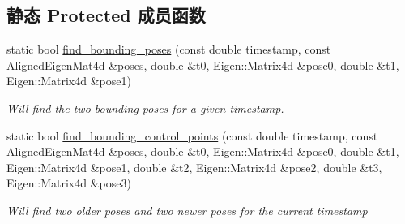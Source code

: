 \subsection*{静态 Protected 成员函数}
\begin{DoxyCompactItemize}
\item 
static bool \hyperlink{classov__core_1_1BsplineSE3_a321442ce3c2aee341c64403e047f3f36}{find\+\_\+bounding\+\_\+poses} (const double timestamp, const \hyperlink{classov__core_1_1BsplineSE3_a2e0b3cb7cef84db7b84598f2ea01e00d}{Aligned\+Eigen\+Mat4d} \&poses, double \&t0, Eigen\+::\+Matrix4d \&pose0, double \&t1, Eigen\+::\+Matrix4d \&pose1)
\begin{DoxyCompactList}\small\item\em Will find the two bounding poses for a given timestamp. \end{DoxyCompactList}\item 
static bool \hyperlink{classov__core_1_1BsplineSE3_af03bc0e8df3f77134afa0a24a425be80}{find\+\_\+bounding\+\_\+control\+\_\+points} (const double timestamp, const \hyperlink{classov__core_1_1BsplineSE3_a2e0b3cb7cef84db7b84598f2ea01e00d}{Aligned\+Eigen\+Mat4d} \&poses, double \&t0, Eigen\+::\+Matrix4d \&pose0, double \&t1, Eigen\+::\+Matrix4d \&pose1, double \&t2, Eigen\+::\+Matrix4d \&pose2, double \&t3, Eigen\+::\+Matrix4d \&pose3)
\begin{DoxyCompactList}\small\item\em Will find two older poses and two newer poses for the current timestamp \end{DoxyCompactList}\end{DoxyCompactItemize}

